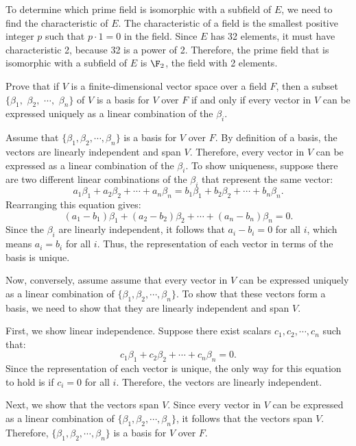 \begin{solution}
  To determine which prime field is isomorphic with a subfield of $E$, we need to find the characteristic of $E$. The characteristic of a field is the smallest positive integer $p$ such that $p \cdot 1 = 0$ in the field. Since $E$ has 32 elements, it must have characteristic 2, because 32 is a power of 2. Therefore, the prime field that is isomorphic with a subfield of $E$ is $\F_2$, the field with 2 elements.
\end{solution}

\begin{problem}[33.21]
  Prove that if $V$ is a finite-dimensional vector space over a field $F$, then a subset $\{\beta_1,$ $\beta_2,$ $\cdots,$ $\beta_n\}$ of $V$ is a basis for $V$ over $F$ if and only if every vector in $V$ can be expressed uniquely as a linear combination of the $\beta_i$.
\end{problem}

\begin{solution}
  Assume that $\{\beta_1, \beta_2, \cdots, \beta_n\}$ is a basis for $V$ over $F$. By definition of a basis, the vectors are linearly independent and span $V$. Therefore, every vector in $V$ can be expressed as a linear combination of the $\beta_i$. To show uniqueness, suppose there are two different linear combinations of the $\beta_i$ that represent the same vector:
  \[%
    a_1\beta_1 + a_2\beta_2 + \cdots + a_n\beta_n = b_1\beta_1 + b_2\beta_2 + \cdots + b_n\beta_n
  .\]%
  Rearranging this equation gives:
  \[%
    (a_1 - b_1)\beta_1 + (a_2 - b_2)\beta_2 + \cdots + (a_n - b_n)\beta_n = 0
  .\]%
  Since the $\beta_i$ are linearly independent, it follows that $a_i - b_i = 0$ for all $i$, which means $a_i = b_i$ for all $i$. Thus, the representation of each vector in terms of the basis is unique.

  Now, conversely, assume assume that every vector in $V$ can be expressed uniquely as a linear combination of $\{\beta_1, \beta_2, \cdots, \beta_n\}$. To show that these vectors form a basis, we need to show that they are linearly independent and span $V$.

  First, we show linear independence. Suppose there exist scalars $c_1, c_2, \cdots, c_n$ such that:
  \[%
    c_1\beta_1 + c_2\beta_2 + \cdots + c_n\beta_n = 0
  .\]%
  Since the representation of each vector is unique, the only way for this equation to hold is if $c_i = 0$ for all $i$. Therefore, the vectors are linearly independent.

  Next, we show that the vectors span $V$. Since every vector in $V$ can be expressed as a linear combination of $\{\beta_1, \beta_2, \cdots, \beta_n\}$, it follows that the vectors span $V$. Therefore, $\{\beta_1, \beta_2, \cdots, \beta_n\}$ is a basis for $V$ over $F$.
\end{solution}

